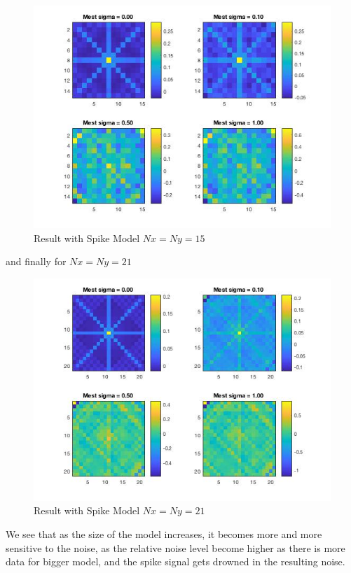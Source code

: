 \documentclass[12pt,a4paper]{extreport}
\begin{document}
\begin{figure}[h]
\includegraphics[width=15cm]{Q3Spike15.jpg} 
\caption{Result with Spike Model $Nx=Ny=15$}
\end{figure}

\newpage
and finally for $Nx=Ny=21$
 
\begin{figure}[h]
\includegraphics[width=15cm]{Q3Spike21.jpg} 
\caption{Result with Spike Model $Nx=Ny=21$}
\end{figure}

We see that as the size of the model increases, it becomes more and more sensitive to the noise, as the relative noise level become higher as there is more data for bigger model, and the spike signal gets drowned in the resulting noise.
\end{document}
